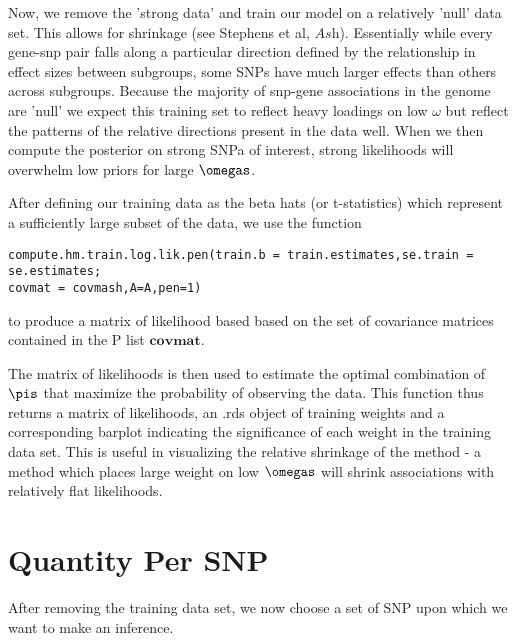 \documentclass[10pt]{article}
\begin{document}
Now, we remove the 'strong data' and train our model on a relatively 'null' data set. This allows for shrinkage (see Stephens et al, $\textit{Ash}$). Essentially while every gene-snp pair falls along a particular direction defined by the relationship in effect sizes between subgroups, some SNPs have much larger effects than others across subgroups. Because the majority of snp-gene associations in the genome are 'null' we expect this training set to reflect heavy loadings on low $\omega$ but reflect the patterns of the relative directions present in the data well. When we then compute the posterior on strong SNPa of interest, strong likelihoods will overwhelm low priors for large $\omegas$.


After defining our training data as the beta hats (or t-statistics) which represent a sufficiently large subset of the data, we use the function 

\begin{verbatim}
compute.hm.train.log.lik.pen(train.b = train.estimates,se.train = se.estimates;
covmat = covmash,A=A,pen=1)
\end{verbatim}
to produce a matrix  of likelihood based based on the set of covariance matrices contained in the P list $\textbf{covmat}$.  


The matrix of likelihoods is then used to estimate the optimal combination of $\pis$ that maximize the probability of observing the data. This function thus returns a matrix of likelihoods, an .rds object of training weights and a corresponding barplot indicating the significance of each weight in the training data set. This is useful in visualizing the relative shrinkage of the method - a method which places large weight on low $\omegas$ will shrink associations with relatively flat likelihoods.


\section{Quantity Per SNP}

After removing the training data set, we now choose a set of SNP upon which we want to make an inference. 
\end{document}
